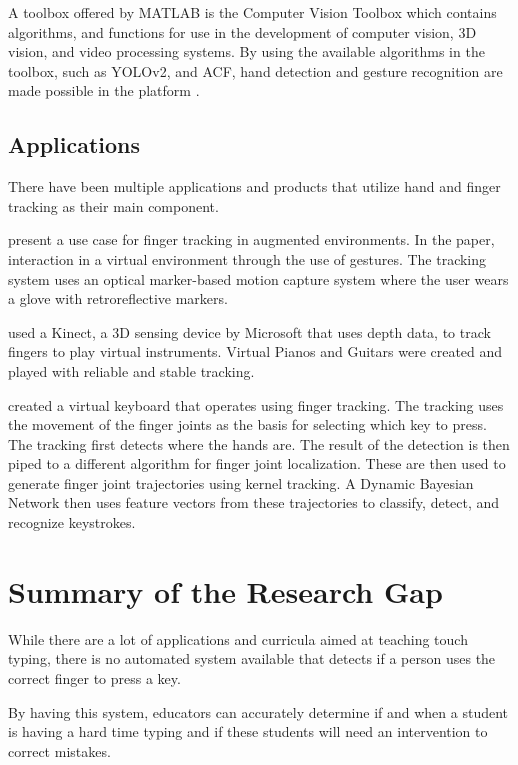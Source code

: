 \documentclass{report}
\begin{document}
A toolbox offered by MATLAB is the Computer Vision Toolbox which contains
algorithms, and functions for use in the development of computer vision, 3D
vision, and video processing systems. By using the available algorithms in the
toolbox, such as YOLOv2, and ACF, hand detection and gesture recognition are
made possible in the platform \parencite{matlab}.

\subsection{Applications}

There have been multiple applications and products that utilize hand and finger
tracking as their main component.

\textcite{dorf2001} present a use case for finger tracking in augmented
environments. In the paper, interaction in a virtual environment through the use
of gestures. The tracking system uses an optical marker-based motion capture
system where the user wears a glove with retroreflective markers.

\textcite{chiang2014} used a Kinect, a 3D sensing device by Microsoft that
uses depth data, to track fingers to play virtual instruments. Virtual Pianos
and Guitars were created and played with reliable and stable tracking.

\textcite{yousaf2014} created a virtual keyboard that operates using finger
tracking. The tracking uses the movement of the finger joints as the basis for
selecting which key to press. The tracking first detects where the hands are.
The result of the detection is then piped to a different algorithm for finger
joint localization. These are then used to generate finger joint trajectories
using kernel tracking. A Dynamic Bayesian Network then uses feature vectors from
these trajectories to classify, detect, and recognize keystrokes.

\section{Summary of the Research Gap}
While there are a lot of applications and curricula aimed at teaching touch
typing, there is no automated system available that detects if a person uses the
correct finger to press a key.

By having this system, educators can accurately determine if and when a student
is having a hard time typing and if these students will need an intervention to
correct mistakes.
\end{document}
